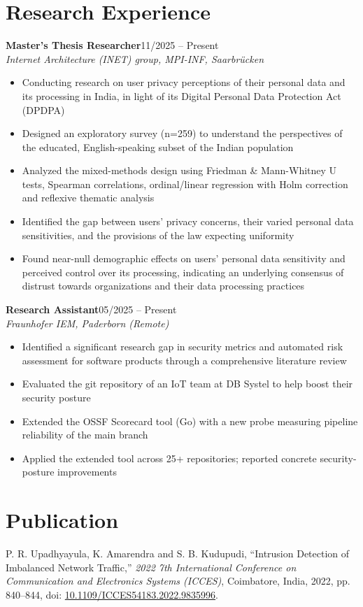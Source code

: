 \documentclass[10pt,a4paper]{article}
\newcommand{\entry}[3]{%
  \textbf{#1}\hfill{#2}\\\textit{#3}\vspace{2pt}}
\begin{document}
\section{Research Experience}
\entry{Master's Thesis Researcher}{11/2025 -- Present}{Internet Architecture (INET) group, MPI-INF, Saarbrücken}
\begin{itemize}
\item Conducting research on user privacy perceptions of their personal data and its processing in India, in light of its Digital Personal Data Protection Act (DPDPA)
\item Designed an exploratory survey (n=259) to understand the perspectives of the educated, English-speaking subset of the Indian population
\item Analyzed the mixed-methods design using Friedman \& Mann-Whitney U tests, Spearman correlations, ordinal/linear regression with Holm correction and reflexive thematic analysis
\item Identified the gap between users' privacy concerns, their varied personal data sensitivities, and the provisions of the law expecting uniformity 
\item Found near-null demographic effects on users' personal data sensitivity and perceived control over its processing, indicating an underlying consensus of distrust towards organizations and their data processing practices
\end{itemize}
\vspace{4pt}
\entry{Research Assistant}{05/2025 -- Present}{Fraunhofer IEM, Paderborn (Remote)}
\begin{itemize}
\item Identified a significant research gap in security metrics and automated risk assessment for software products through a comprehensive literature review
\item Evaluated the git repository of an IoT team at DB Systel to help boost their security posture
\item Extended the OSSF Scorecard tool (Go) with a new probe measuring pipeline reliability of the main branch
\item Applied the extended tool across 25+ repositories; reported concrete security-posture improvements
\end{itemize}

\section{Publication}
P. R. Upadhyayula, K. Amarendra and S. B. Kudupudi, ``Intrusion Detection of Imbalanced Network Traffic,'' \textit{2022 7th International Conference on Communication and Electronics Systems (ICCES)}, Coimbatore, India, 2022, pp. 840--844, doi: \href{https://doi.org/10.1109/ICCES54183.2022.9835996}{10.1109/ICCES54183.2022.9835996}.
\end{document}
